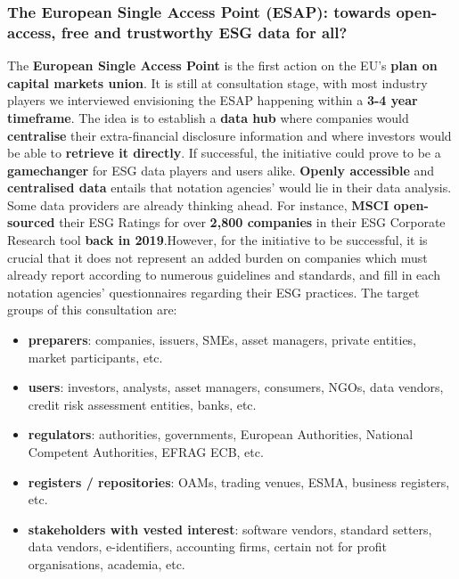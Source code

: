 \documentclass[12pt]{report}
\begin{document}
\subsubsection{The European Single Access Point (ESAP): towards open-access, free and trustworthy ESG data for all? }
The \textbf{European Single Access Point} is the first action on the EU’s \textbf{plan on capital markets union}. It is still at consultation stage, with most industry players we interviewed envisioning the ESAP happening within a \textbf{3-4 year timeframe}. The idea is to establish a \textbf{data hub} where companies would \textbf{centralise} their extra-financial disclosure information and where investors would be able to \textbf{retrieve it directly}.\newline 
If successful, the initiative could prove to be a \textbf{gamechanger} for ESG data players and users alike. \textbf{Openly accessible} and \textbf{centralised data} entails that notation agencies’ would lie in their data analysis. Some data providers are already thinking ahead. For instance, \textbf{MSCI open-sourced} their ESG Ratings for over \textbf{2,800 companies} in their ESG Corporate Research tool \textbf{back in 2019}.\newline However, for the initiative to be successful, it is crucial that it does not represent an added burden on companies which must already report according to numerous guidelines and standards, and fill in each notation agencies’ questionnaires regarding their ESG practices. \newline
The target groups of this consultation are:
\begin{itemize}
    \item \textbf{preparers}: companies, issuers, SMEs, asset managers, private entities, market participants, etc.
    \item \textbf{users}: investors, analysts, asset managers, consumers, NGOs, data vendors, credit risk assessment entities, banks, etc.
    \item \textbf{regulators}: authorities, governments, European Authorities, National Competent Authorities, EFRAG ECB, etc.
    \item \textbf{registers / repositories}: OAMs, trading venues, ESMA, business registers, etc.
    \item \textbf{stakeholders with vested interest}: software vendors, standard setters, data vendors, e-identifiers, accounting firms, certain not for profit organisations, academia, etc.
\end{itemize}
\end{document}
